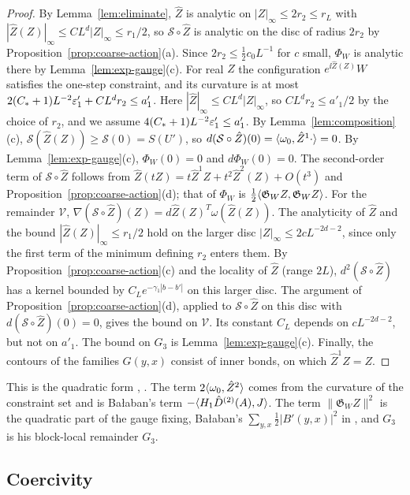 \begin{proof}
By Lemma~\ref{lem:eliminate}, $\hat Z$ is analytic on $|Z|_\infty\le2r_2\le r_L$ with $|\hat Z(Z)|_\infty\le CL^d|Z|_\infty\le r_1/2$, so $\mathcal S\circ\hat Z$ is analytic on the disc of radius $2r_2$ by Proposition~\ref{prop:coarse-action}(a). Since $2r_2\le\frac12c_0L^{-1}$ for $c$ small, $\Phi_W$ is analytic there by Lemma~\ref{lem:exp-gauge}(c). For real $Z$ the configuration $e^{\ii\hat Z(Z)}W$ satisfies the one-step constraint, and its curvature is at most $2(C_*+1)L^{-2}\varepsilon'_1+CL^dr_2\le a'_1$. Here $|\hat Z|_\infty\le CL^d|Z|_\infty$, so $CL^dr_2\le a'_1/2$ by the choice of $r_2$, and we assume $4(C_*+1)L^{-2}\varepsilon'_1\le a'_1$. By Lemma~\ref{lem:composition}(c), $\mathcal S(\hat Z(Z))\ge\mathcal S(0)=S(U')$, so $d(\mathcal S\circ\hat Z)(0)=\langle \omega_0,\hat Z^1\cdot\rangle=0$. By Lemma~\ref{lem:exp-gauge}(c), $\Phi_W(0)=0$ and $d\Phi_W(0)=0$. The second-order term of $\mathcal S\circ\hat Z$ follows from $\hat Z(tZ)=t\hat Z^1Z+t^2\hat Z^2(Z)+O(t^3)$ and Proposition~\ref{prop:coarse-action}(d); that of $\Phi_W$ is $\frac12\langle \mathfrak G_WZ,\mathfrak G_WZ\rangle$. For the remainder $\mathcal V$, $\nabla(\mathcal S\circ\hat Z)(Z)=d\hat Z(Z)^T\omega(\hat Z(Z))$. The analyticity of $\hat Z$ and the bound $|\hat Z(Z)|_\infty\le r_1/2$ hold on the larger disc $|Z|_\infty\le2cL^{-2d-2}$, since only the first term of the minimum defining $r_2$ enters them. By Proposition~\ref{prop:coarse-action}(c) and the locality of $\hat Z$ (range $2L$), $d^2(\mathcal S\circ\hat Z)$ has a kernel bounded by $C_Le^{-\gamma_1|b-b'|}$ on this larger disc. The argument of Proposition~\ref{prop:coarse-action}(d), applied to $\mathcal S\circ\hat Z$ on this disc with $d(\mathcal S\circ\hat Z)(0)=0$, gives the bound on $\mathcal V$. Its constant $C_L$ depends on $cL^{-2d-2}$, but not on $a'_1$. The bound on $G_3$ is Lemma~\ref{lem:exp-gauge}(c). Finally, the contours of the families $G(y,x)$ consist of inner bonds, on which $\hat Z^1Z=Z$.
\end{proof}

This is the quadratic form \cite[(53)--(54)]{BalUV3}, \cite[(2.5)--(2.8)]{BalYM4I}. The term $2\langle \omega_0,\hat Z^2\rangle$ comes from the curvature of the constraint set and is Ba\l aban's term $-\langle H_1\hat D^{(2)}(A),J\rangle$. The term $\|\mathfrak G_WZ\|^2$ is the quadratic part of the gauge fixing, Ba\l aban's $\sum_{y,x}\frac12|B'(y,x)|^2$ in \cite[(2.5)]{BalYM4I}, and $G_3$ is his block-local remainder $G_3$.

\subsection{Coercivity}\label{ss:34.2}

